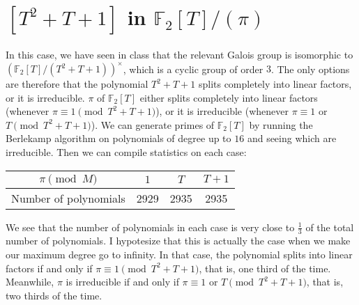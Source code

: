 \documentclass[11pt]{article}
\theoremstyle{definition}
\begin{document}
    \section{$[T^2 + T + 1]$ in $\mathbb{F}_2[T] / (\pi)$}

    In this case, we have seen in class that the relevant Galois group is isomorphic to \linebreak
    ${(\mathbb{F}_2[T]/(T^2+T+1))^{\times}}$,
    which is a cyclic group of order $3$.
    The only options are therefore that the polynomial $T^2 + T + 1$ splits completely into linear factors, or it is irreducible.
    $\pi$ of $\mathbb{F}_2[T]$ either
    splits completely into linear factors (whenever $\pi \equiv 1 \pmod{T^2 + T + 1}$), or it is irreducible (whenever $\pi \equiv 1$ or $T \pmod{T^2 + T + 1}$).
    We can generate primes of $\mathbb{F}_2[T]$ by running the Berlekamp algorithm on polynomials of degree up to $16$ and seeing which are irreducible.
    Then we can compile statistics on each case:

    \begin{center}
        \begin{tabular}{|c|c|c|c|}
            \hline
            $\pi \pmod M$  & $1$ & $T$ & $T + 1$ \\
            \hline
             Number of polynomials & 2929 & 2935 & 2935 \\
            \hline
        \end{tabular}
    \end{center}

    \noindent We see that the number of polynomials in each case is very close to $\frac{1}{3}$ of the total number of polynomials.
    I hypotesize that this is actually the case when we make our maximum degree go to infinity.
    In that case, the polynomial splits into linear factors if and only if $\pi \equiv 1 \pmod{T^2 + T + 1}$, that is,
    one third of the time.
    Meanwhile, $\pi$ is irreducible if and only if $\pi \equiv 1$ or $T \pmod{T^2 + T + 1}$, that is,
    two thirds of the time.
\end{document}
